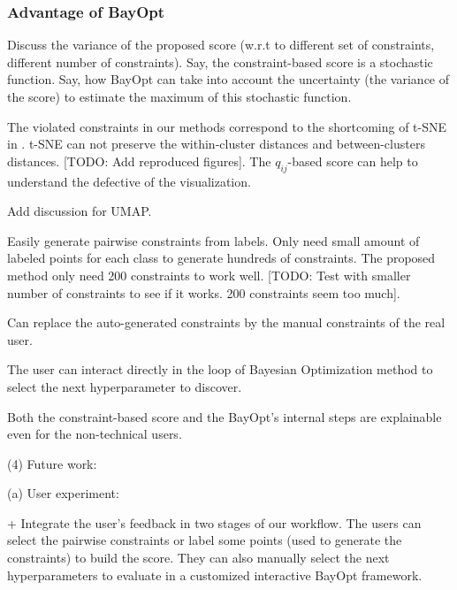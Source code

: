 \subsubsection*{Advantage of BayOpt}

\par
Discuss the variance of the proposed score (w.r.t to different set of constraints, different number of constraints).
Say, the constraint-based score is a stochastic function.
Say, how BayOpt can take into account the uncertainty (the variance of the score) to estimate the maximum of this stochastic function.


\par
The violated constraints in our methods correspond to the shortcoming of t-SNE in \cite{wattenberg2016use}.
t-SNE can not preserve the within-cluster distances and between-clusters distances.
[TODO: Add reproduced figures].
The $q_{ij}$-based score can help to understand the defective of the visualization.

\par
Add discussion for UMAP.

\par
Easily generate pairwise constraints from labels.
  Only need small amount of labeled points for each class to generate hundreds of constraints.
  The proposed method only need 200 constraints to work well.
  [TODO: Test with smaller number of constraints to see if it works. 200 constraints seem too much].

\par
Can replace the auto-generated constraints by the manual constraints of the real user.

\par
The user can interact directly in the loop of Bayesian Optimization method to select the next hyperparameter to discover.


\par
Both the constraint-based score and the BayOpt's internal steps are explainable even for the non-technical users.

\vspace{8pt}
\par (4) Future work:

(a) User experiment:

+ Integrate the user's feedback in two stages of our workflow.
The users can select the pairwise constraints or label some points (used to generate the constraints) to build the score.
They can also manually select the next hyperparameters to evaluate in a customized interactive BayOpt framework.

